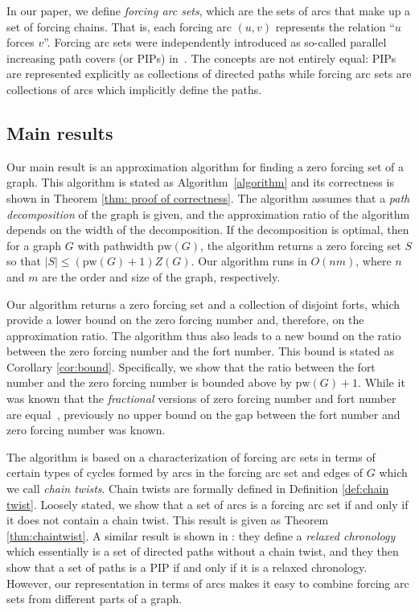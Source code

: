 \documentclass[12pt]{amsart}
\theoremstyle{plain}
\theoremstyle{definition}
\def\pw{\mathrm{pw}}
\begin{document}
In our paper, we define \emph{forcing arc sets}, which are the sets of arcs that make up a set of forcing chains. That is, each forcing arc $(u,v)$ represents the relation ``$u$ forces $v$''. 
Forcing arc sets were independently introduced as so-called parallel increasing path covers (or PIPs) in~\cite{PIPs}. The concepts are not entirely equal: PIPs are represented explicitly as collections of directed paths while forcing arc sets are collections of arcs which implicitly define the paths.

\subsection{Main results}

Our main result is an approximation algorithm for finding a zero forcing set of a graph. This algorithm is stated as Algorithm~\ref{algorithm} and its correctness is shown in Theorem \ref{thm: proof of correctness}. The algorithm assumes that a \emph{path decomposition} of the graph is given, and the approximation ratio of the algorithm depends on the width of the decomposition. 
If the decomposition is optimal, then for a graph $G$ with pathwidth $\pw(G)$, the algorithm returns a zero forcing set $S$ so that $|S|\leq (\pw(G)+1)Z(G)$. Our algorithm runs in $O(nm)$, where $n $ and $m$ are the order and size of the graph, respectively. 




Our algorithm returns a zero forcing set and a collection of disjoint forts, which provide a lower bound on the zero forcing number and, therefore, on the approximation ratio. The algorithm thus also leads to a new bound on the ratio between the zero forcing number and the fort number. This bound is stated as Corollary \ref{cor:bound}. Specifically, we show that the ratio between the fort number and the zero forcing number is bounded above by $\pw(G)+1$. 
While it was known that the {\sl fractional} versions of zero forcing number and fort number are equal~\cite[Remark 2.6]{cameron2023forts}, previously no upper bound on the gap between the fort number and zero forcing number was known. 

The algorithm is based on  a characterization of forcing arc sets in terms of certain types of cycles formed by arcs in the forcing arc set and edges of $G$ which we call \emph{chain twists}. Chain twists are formally defined in Definition \ref{def:chain twist}. Loosely stated, we show that a set of arcs is a forcing arc set if and only if it does not contain a chain twist. This result is given as Theorem \ref{thm:chaintwist}. A similar result is shown in \cite[Theorem 3.8]{PIPs}: they define a \emph{relaxed chronology} which essentially is a set of directed paths without a chain twist, and they then show that a set of paths is a PIP if and only if it is a relaxed chronology. However, our representation in terms of arcs makes it easy to combine forcing arc sets from different parts of a graph.
\end{document}
